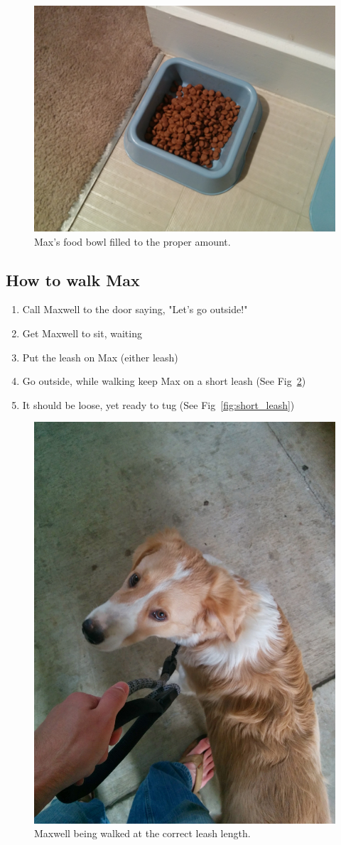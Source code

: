 \documentclass[pdftex,12pt]{article}
\begin{document}
\bigskip

\begin{figure}[h!]
    \centering
    \includegraphics[width=.35\textwidth]{./images/how_to/feed_max/food_bowl_filled.jpg}
    \caption{Max's food bowl filled to the proper amount.}
    \label{fig:food_bowl_filled}
\end{figure}

\subsection{How to walk Max}
\begin{enumerate}\label{itm:how_to_walk}
    \item Call Maxwell to the door saying, "Let's go outside!"
    \item Get Maxwell to sit, waiting
    \item Put the leash on Max (either leash)
    \item Go outside, while walking keep Max on a short leash
        (See Fig~\ref{fig:walking_max})
    \item It should be loose, yet ready to tug
        (See Fig~\ref{fig:short_leash})
\end{enumerate}

\begin{figure}[H]
    \centering
    \includegraphics[width=.35\textwidth]{./images/how_to/walk_max/walking_max.jpg}
    \caption{Maxwell being walked at the correct leash length.}
    \label{fig:walking_max}
\end{figure}
\end{document}

